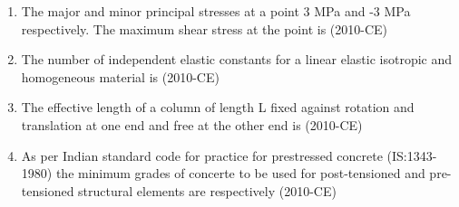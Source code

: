\documentclass[journal,12pt,twocolumn]{IEEEtran}
\theoremstyle{remark}
\begin{document}
\begin{enumerate}
\item The major and minor principal stresses at a point 3 MPa and -3 MPa respectively. The maximum shear stress at the point is \hfill{(2010-CE)}

\begin{enumerate}
		  \end{enumerate}
	
\item The number of independent elastic constants for a linear elastic isotropic and homogeneous material is \hfill{(2010-CE)}

\begin{enumerate}
\end{enumerate}
			 
\item The effective length of a column of length L fixed against rotation and translation at one end and free at the other end is \hfill{(2010-CE)}

\begin{enumerate}
\end{enumerate}

\item As per Indian standard code for practice for prestressed concrete (IS:1343-1980) the minimum grades of concerte to be used for post-tensioned and pre-tensioned structural elements are respectively \hfill{(2010-CE)}

\begin{enumerate}
\end{enumerate}



\end{enumerate}
\end{document}
